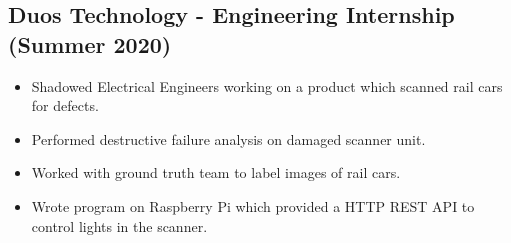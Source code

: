 \documentclass{article}
\newenvironment{CustomItemize}
{ \begin{itemize}[leftmargin=1em]
    \setlength{\itemsep}{0pt}
    \setlength{\parskip}{0pt}
    \setlength{\parindent}{0pt}
    \setlength{\parsep}{0pt}     }
{ \end{itemize}                  }
\begin{document}
\subsection{Duos Technology - Engineering Internship (Summer 2020)}
\begin{CustomItemize}
\item Shadowed Electrical Engineers working on a product which scanned rail cars for defects.
\item Performed destructive failure analysis on damaged scanner unit.
\item Worked with ground truth team to label images of rail cars.
\item Wrote program on Raspberry Pi which provided a HTTP REST API to control lights in the scanner.
\end{CustomItemize}



\end{document}

